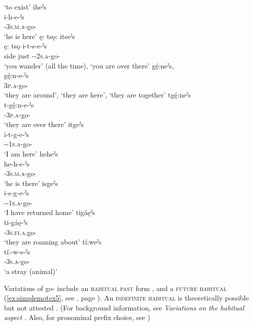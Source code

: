 \ea\label{ex:simplemotex3}  ‘to exist’
\ea iheˀs\\
\gll i-h-e-ˀs\\
 {\prothetic}-\textsc{3s.m.a}-go-{\habitual}\\
\glt `he is here'
\ex ę: tsǫ: itseˀs \\
\gll ę: tsǫ i-t-s-e-ˀs\\
side just {\prothetic}-{\cislocative}-\textsc{2s.a}-go-{\habitual}\\
\glt ‘you wander’ (all the time), `you are over there'
\ex gę́:neˀs,\\
\gll gę́:n-e-ˀs\\
 \textsc{3p.a}-go-{\habitual}\\
\glt  ‘they are around’, ‘they are here’, `they are together'
\ex tgę́:neˀs\\
\gll t-gę́:n-e-ˀs\\
 {\cislocative}-\textsc{3p.a}-go-{\habitual}\\
\glt `they are over there'
\ex itgeˀs\\
\gll i-t-g-e-ˀs\\
 {\prothetic}-{\cislocative}-\textsc{1s.a}-go-{\habitual}\\
\glt `I am here'
\ex heheˀs\\
\gll he-h-e-ˀs\\
 {\translocative}-\textsc{3s.m.a}-go-{\habitual}\\
\glt `he is there'
\ex isgeˀs\\
\gll i-s-g-e-ˀs\\
 {\prothetic}-{\repetitive}-\textsc{1s.a}-go-{\habitual}\\
\glt `I have returned home'
\ex tigáęˀs\\
\gll ti-gáę-ˀs\\
 {\contrastive}-\textsc{3s.fi.a}.go-{\habitual}\\
\glt `they are roaming about'
\ex tí:weˀs\\
\gll tí:-w-e-ˀs\\
 {\contrastive}-\textsc{3s.a}-go-{\habitual}\\
\glt `a stray (animal)'
\z
\z

Variations of  go-{\habitual} include an \textsc{habitual past} form , and a \textsc{future habitual} (\ref{ex:simplemotex5}, see , page \pageref{figtab:1:purposiveasp}). An \textsc{indefinite habitual} is theoretically possible but not attested . (For background information, see \textit{Variations on the habitual aspect} . Also, for pronominal prefix choice, see )

